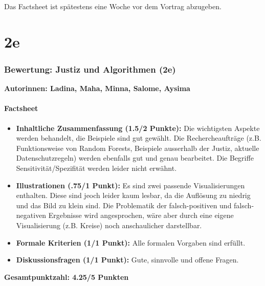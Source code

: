 \vspace{1em}

Das Factsheet ist spätestens eine Woche vor dem Vortrag abzugeben.


\newpage
\part*{2e}
\newpage


\section*{Bewertung: Justiz und Algorithmen (2e)}

\textbf{Autorinnen: Ladina, Maha, Minna, Salome, Aysima}

\subsection*{Factsheet}

\begin{itemize}
    \item \textbf{Inhaltliche Zusammenfassung (1.5/2 Punkte):} Die wichtigsten Aspekte werden behandelt, die Beispiele sind gut gewählt. Die Rechercheaufträge (z.B. Funktionsweise von Random Forests, Beispiele ausserhalb der Justiz, aktuelle Datenschutzregeln) werden ebenfalls gut und genau bearbeitet. Die Begriffe Sensitivität/Spezifität werden leider nicht erwähnt.
    \item \textbf{Illustrationen (.75/1 Punkt):} Es sind zwei passende Visualisierungen enthalten. Diese sind jeoch leider kaum lesbar, da die Auflösung zu niedrig und das Bild zu klein sind. Die Problematik der falsch-positiven und falsch-negativen Ergebnisse wird angesprochen, wäre aber durch eine eigene Visualisierung (z.B. Kreise) noch anschaulicher darstellbar.
    \item \textbf{Formale Kriterien (1/1 Punkt):} Alle formalen Vorgaben sind erfüllt.
    \item \textbf{Diskussionsfragen (1/1 Punkt):} Gute, sinnvolle und offene Fragen.
\end{itemize}

\textbf{Gesamtpunktzahl: 4.25/5 Punkten}

